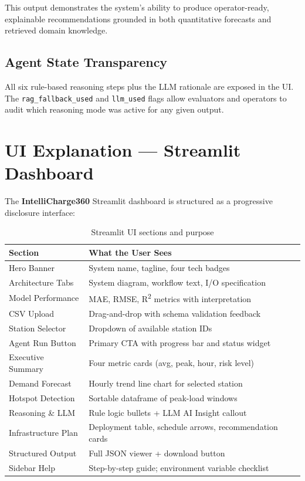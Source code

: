\documentclass[12pt,a4paper]{article}
\begin{document}
This output demonstrates the system's ability to produce operator-ready, explainable
recommendations grounded in both quantitative forecasts and retrieved domain knowledge.

\subsection{Agent State Transparency}

All six rule-based reasoning steps plus the LLM rationale are exposed in the UI.
The \texttt{rag\_fallback\_used} and \texttt{llm\_used} flags allow evaluators and
operators to audit which reasoning mode was active for any given output.

\section{UI Explanation — Streamlit Dashboard}
\label{sec:ui}

The \textbf{IntelliCharge360} Streamlit dashboard is structured as a progressive
disclosure interface:

\begin{table}[H]
\centering
\caption{Streamlit UI sections and purpose}
\begin{tabularx}{\linewidth}{lX}
  \toprule
  \textbf{Section} & \textbf{What the User Sees} \\
  \midrule
  Hero Banner         & System name, tagline, four tech badges \\
  Architecture Tabs   & System diagram, workflow text, I/O specification \\
  Model Performance   & MAE, RMSE, R\textsuperscript{2} metrics with interpretation \\
  CSV Upload          & Drag-and-drop with schema validation feedback \\
  Station Selector    & Dropdown of available station IDs \\
  Agent Run Button    & Primary CTA with progress bar and status widget \\
  Executive Summary   & Four metric cards (avg, peak, hour, risk level) \\
  Demand Forecast     & Hourly trend line chart for selected station \\
  Hotspot Detection   & Sortable dataframe of peak-load windows \\
  Reasoning \& LLM    & Rule logic bullets + LLM AI Insight callout \\
  Infrastructure Plan & Deployment table, schedule arrows, recommendation cards \\
  Structured Output   & Full JSON viewer + download button \\
  Sidebar Help        & Step-by-step guide; environment variable checklist \\
  \bottomrule
\end{tabularx}
\end{table}
\end{document}
